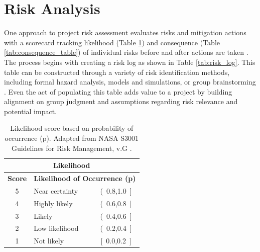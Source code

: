 \section{Risk Analysis}
\label{ch7:risk_analysis}

One approach to project risk assessment evaluates risks and mitigation actions with a scorecard tracking likelihood (Table \ref{tab:likelihood_table}) and consequence (Table \ref{tab:consequence_table}) of individual risks before and after actions are taken \citep{malone_development_2004}. The process begins with creating a risk log as shown in Table \ref{tab:risk_log}. This table can be constructed through a variety of risk identification methods, including formal hazard analysis, models and simulations, or group brainstorming \citep{nasa_s3001_2017}. Even the act of populating this table adds value to a project by building alignment on group judgment and assumptions regarding risk relevance and potential impact.

\begin{table}%
\centering
\begin{tabular}{|c|l|c|}
\hline
\multicolumn{3}{|c|}{\textbf{Likelihood}} \\ \hline
\textbf{Score} & \multicolumn{2}{c|}{\textbf{Likelihood of Occurrence (p)}} \\ \hline
5 & Near certainty & (\ 0.8,1.0\ {]} \\ \hline
4 & Highly likely & (\ 0.6,0.8\ {]} \\ \hline
3 & Likely & (\ 0.4,0.6\ {]} \\ \hline
2 & Low likelihood & (\ 0.2,0.4\ {]} \\ \hline
1 & Not likely & {[}\ 0.0,0.2\ {]} \\ \hline
\end{tabular}
\caption[Risk likelihood]{Likelihood score based on probability of occurrence (p). Adapted from NASA S3001 Guidelines for Risk Management, v.G \protect\citep{malone_development_2004}.}
\label{tab:likelihood_table}
\end{table}

